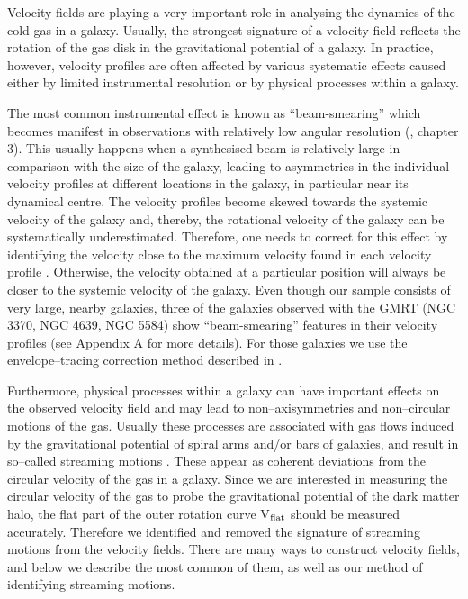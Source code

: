\documentclass[usenatbib,useAMS]{mnras}
\begin{document}
Velocity fields are playing a very important role in analysing the
dynamics of the cold gas in a galaxy.  Usually, the strongest signature
of a velocity field reflects the rotation of the gas disk in the
gravitational potential of a galaxy.  In practice, however, velocity
profiles are often affected by various systematic effects caused either
by limited instrumental resolution or by physical processes within a
galaxy. 

The most common instrumental effect is known as ``beam-smearing'' which
becomes manifest in observations with relatively low angular resolution
(\citet{bosma78}, chapter 3).  This usually happens when a synthesised
beam is relatively large in comparison with the size of the galaxy,
leading to asymmetries in the individual velocity profiles at different
locations in the galaxy, in particular near its dynamical centre.  The
velocity profiles become skewed towards the systemic velocity of the
galaxy and, thereby, the rotational velocity of the galaxy can be
systematically underestimated.  Therefore, one needs to correct for this
effect by identifying the velocity close to the maximum velocity found
in each velocity profile \citep{sancisiallen}.  Otherwise, the velocity
obtained at a particular position will always be closer to the systemic
velocity of the galaxy.  Even though our sample consists of very large,
nearby galaxies, three of the galaxies observed with the GMRT (NGC
3370, NGC 4639, NGC 5584) show ``beam-smearing'' features in their
velocity profiles (see Appendix A for more details).  For those galaxies
we use the envelope--tracing correction method described in
\citet{versanc01}. 

Furthermore, physical processes within a galaxy can have important
effects on the observed velocity field and may lead to
non--axisymmetries and non--circular motions of the gas.  Usually these
processes are associated with gas flows induced by the gravitational
potential of spiral arms and/or bars of galaxies, and result in
so--called streaming motions \citep{visser80, shetty07}.  These appear
as coherent deviations from the circular velocity of the gas in a
galaxy.  Since we are interested in measuring the circular velocity of
the gas to probe the gravitational potential of the dark matter halo,
the flat part of the outer rotation curve V$_{\rm flat}$ should be
measured accurately.  Therefore we identified and removed the signature
of streaming motions from the velocity fields.  There are many ways to
construct velocity fields, and below we describe the most common of
them, as well as our method of identifying streaming motions. 
\end{document}
